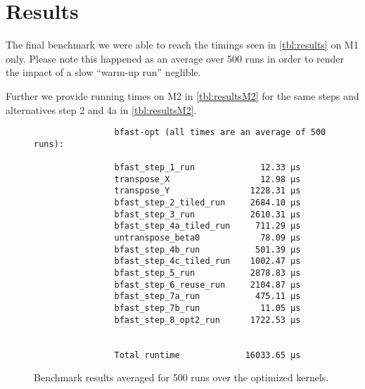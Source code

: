 \section{Results}

The final benchmark we were able to reach the timings seen in
\autoref{tbl:results} on M1 only.
Please note this happened as an average over 500 runs in order to render the
impact of a slow \enquote{warm-up run} neglible.

Further we provide running times on M2 in \autoref{tbl:resultsM2} for the same
steps and alternatives step 2 and 4a in \autoref{tbl:resultsM2}.
\begin{figure}[H]
\centering
                \begin{verbatim}
                bfast-opt (all times are an average of 500 runs):

                bfast_step_1_run             12.33 µs
                transpose_X                  12.98 µs
                transpose_Y                1228.31 µs
                bfast_step_2_tiled_run     2684.10 µs
                bfast_step_3_run           2610.31 µs
                bfast_step_4a_tiled_run     711.29 µs
                untranspose_beta0            78.09 µs
                bfast_step_4b_run           501.39 µs
                bfast_step_4c_tiled_run    1002.47 µs
                bfast_step_5_run           2878.83 µs
                bfast_step_6_reuse_run     2104.87 µs
                bfast_step_7a_run           475.11 µs
                bfast_step_7b_run            11.05 µs
                bfast_step_8_opt2_run      1722.53 µs


                Total runtime             16033.65 µs

                \end{verbatim}
\caption{Benchmark results averaged for 500 runs over the optimized kernels.}
\label{tbl:results}
\end{figure}



